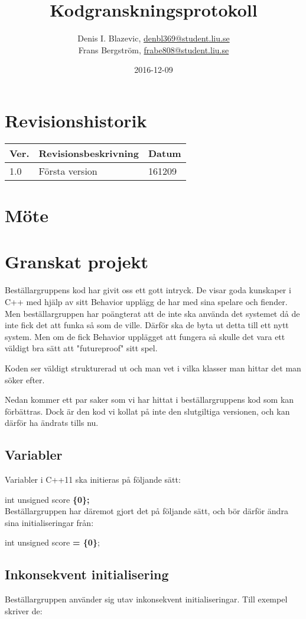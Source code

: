 \documentclass{template}
\author{Denis I. Blazevic, \url{denbl369@student.liu.se}\\
  Frans Bergström, \url{frabe808@student.liu.se}\\}
\title{Kodgranskningsprotokoll}
\date{2016-12-09}
\begin{document}
\projectpage
\section{Revisionshistorik}
\begin{table}[!h]
\begin{tabularx}{\linewidth}{|l|X|l|}
\hline
Ver. & Revisionsbeskrivning & Datum \\\hline
1.0 & Första version & 161209 \\\hline
\end{tabularx}
\end{table}


\section{Möte}


\section{Granskat projekt}
Beställargruppens kod har givit oss ett gott intryck. De visar goda kunskaper i C++ med hjälp av sitt Behavior upplägg de har med sina spelare och fiender. 
Men beställargruppen har poängterat att de inte ska använda det systemet då de inte fick det att funka så som de ville. Därför ska de byta ut detta till ett nytt system.
Men om de fick Behavior upplägget att fungera så skulle det vara ett väldigt bra sätt att "futureproof" sitt spel.

Koden ser väldigt strukturerad ut och man vet i vilka klasser man hittar det man söker efter. 

Nedan kommer ett par saker som vi har hittat i beställargruppens kod som kan förbättras.
Dock är den kod vi kollat på inte den slutgiltiga versionen, och kan därför ha ändrats tills nu.

\subsection{Variabler}
Variabler i C++11 ska initieras på följande sätt:

int unsigned score \textbf{\{0\};}\\
Beställargruppen har däremot gjort det på följande sätt, och bör därför ändra sina initialiseringar från:

int unsigned score \textbf{= \{0\}};

\subsection{Inkonsekvent initialisering}
Beställargruppen använder sig utav inkonsekvent initialiseringar.
Till exempel skriver de:
\end{document}
